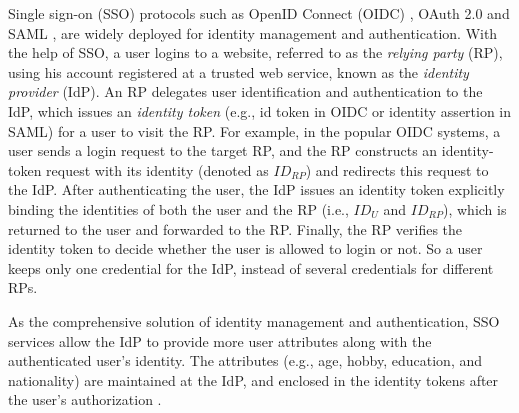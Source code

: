 Single sign-on (SSO) protocols such as OpenID Connect (OIDC) \cite{OpenIDConnect}, OAuth 2.0 \cite{rfc6749} and SAML \cite{SAML,SAMLIdentifier},
 are widely deployed for identity management and authentication.
 With the help of SSO,
  a user logins to a website, referred to as the \emph{relying party} (RP), using his account registered at a trusted web service,
   known as the \emph{identity provider} (IdP).
An RP delegates user identification and authentication to the IdP,
    which issues an \emph{identity token} (e.g., id token in OIDC or identity assertion in SAML) for a user to visit the RP. %
%
%
For example, in the popular OIDC systems,
     a user sends a login request to the target RP, %
and the RP constructs an identity-token request with its identity (denoted as $ID_{RP}$) and redirects this request to the IdP.
After authenticating the user,
 the IdP issues an identity token explicitly binding the identities of both the user and the RP (i.e., $ID_U$ and $ID_{RP}$),
    which is returned to the user and forwarded to the RP. %
Finally, the RP verifies the identity token to decide whether the user is allowed to login or not.
So a user keeps only one credential for the IdP, instead of several credentials for different RPs.

As the comprehensive solution of identity management and authentication,
    SSO services allow the IdP to provide more user attributes %
        along with the authenticated user's identity.
The attributes (e.g., age, hobby, education, and nationality) are maintained at the IdP,
    and enclosed in the identity tokens after the user's authorization \cite{OpenIDConnect,rfc6749}.

